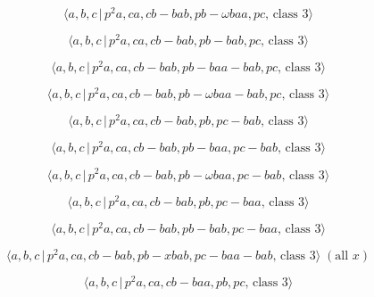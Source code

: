 \documentclass[10pt]{article}
\begin{document}
\begin{equation}
\langle a,b,c\,|\,p^{2}a,ca,cb-bab,pb-\omega baa,pc,\,\text{class }3\rangle 
\tag{7.1057}
\end{equation}

\begin{equation}
\langle a,b,c\,|\,p^2a,ca,cb-bab,pb-bab,pc,\,\text{class }3\rangle 
\tag{7.1058}
\end{equation}

\begin{equation}
\langle a,b,c\,|\,p^2a,ca,cb-bab,pb-baa-bab,pc,\,\text{class }3\rangle 
\tag{7.1059}
\end{equation}

\begin{equation}
\langle a,b,c\,|\,p^{2}a,ca,cb-bab,pb-\omega baa-bab,pc,\,\text{class }%
3\rangle  \tag{7.1060}
\end{equation}

\begin{equation}
\langle a,b,c\,|\,p^2a,ca,cb-bab,pb,pc-bab,\,\text{class }3\rangle 
\tag{7.1061}
\end{equation}

\begin{equation}
\langle a,b,c\,|\,p^2a,ca,cb-bab,pb-baa,pc-bab,\,\text{class }3\rangle 
\tag{7.1062}
\end{equation}

\begin{equation}
\langle a,b,c\,|\,p^{2}a,ca,cb-bab,pb-\omega baa,pc-bab,\,\text{class }%
3\rangle  \tag{7.1063}
\end{equation}

\begin{equation}
\langle a,b,c\,|\,p^2a,ca,cb-bab,pb,pc-baa,\,\text{class }3\rangle 
\tag{7.1064}
\end{equation}

\begin{equation}
\langle a,b,c\,|\,p^2a,ca,cb-bab,pb-bab,pc-baa,\,\text{class }3\rangle 
\tag{7.1065}
\end{equation}

\begin{equation}
\langle a,b,c\,|\,p^2a,ca,cb-bab,pb-xbab,pc-baa-bab,\,\text{class }3\rangle
\;(\text{all }x)  \tag{7.1066}
\end{equation}

\begin{equation}
\langle a,b,c\,|\,p^2a,ca,cb-baa,pb,pc,\,\text{class }3\rangle  \tag{7.1067}
\end{equation}
\end{document}
